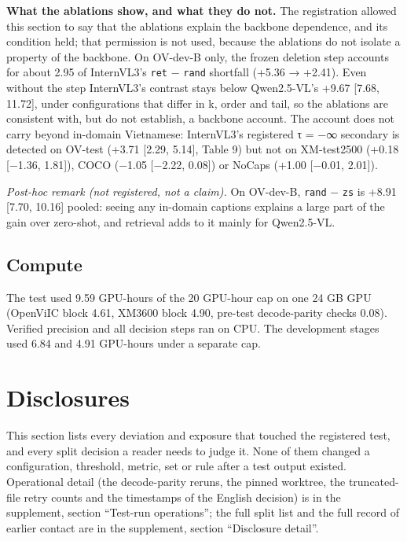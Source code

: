 \textbf{What the ablations show, and what they do not.} The registration allowed this section to say
that the ablations explain the backbone dependence, and its condition held; that permission is not
used, because the ablations do not isolate a property of the backbone. On OV-dev-B only, the frozen
deletion step accounts for about 2.95 of InternVL3's \texttt{ret} − \texttt{rand} shortfall (+5.36 →
+2.41). Even without the step InternVL3's contrast stays below Qwen2.5-VL's +9.67 {[}7.68, 11.72{]},
under configurations that differ in k, order and tail, so the ablations are consistent with, but do
not establish, a backbone account. The account does not carry beyond in-domain Vietnamese:
InternVL3's registered τ = −∞ secondary is detected on OV-test (+3.71 {[}2.29, 5.14{]}, Table 9) but
not on XM-test2500 (+0.18 {[}−1.36, 1.81{]}), COCO (−1.05 {[}−2.22, 0.08{]}) or NoCaps (+1.00
{[}−0.01, 2.01{]}).

\emph{Post-hoc remark (not registered, not a claim).} On OV-dev-B, \texttt{rand} − \texttt{zs} is
+8.91 {[}7.70, 10.16{]} pooled: seeing any in-domain captions explains a large part of the gain over
zero-shot, and retrieval adds to it mainly for Qwen2.5-VL.

\subsection{Compute}\label{compute}

The test used 9.59 GPU-hours of the 20 GPU-hour cap on one 24 GB GPU (OpenViIC block 4.61, XM3600
block 4.90, pre-test decode-parity checks 0.08). Verified precision and all decision steps ran on
CPU. The development stages used 6.84 and 4.91 GPU-hours under a separate cap.

\section{Disclosures}\label{disclosures}

This section lists every deviation and exposure that touched the registered test, and every split
decision a reader needs to judge it. None of them changed a configuration, threshold, metric, set or
rule after a test output existed. Operational detail (the decode-parity reruns, the pinned worktree,
the truncated-file retry counts and the timestamps of the English decision) is in the supplement,
section ``Test-run operations''; the full split list and the full record of earlier contact are in
the supplement, section ``Disclosure detail''.

